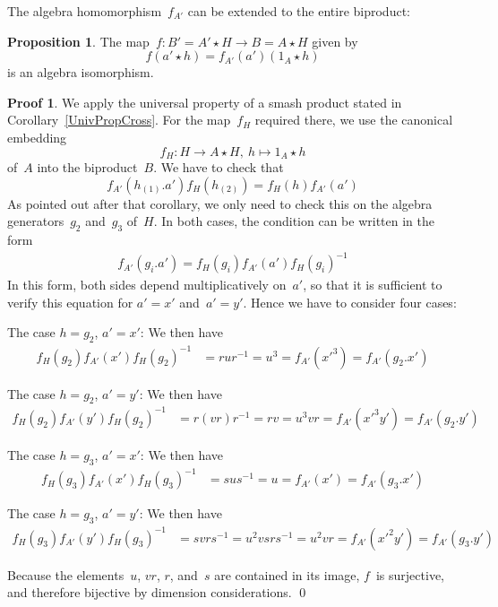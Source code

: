 \documentclass{article}
\newcounter{num}
\newenvironment{parlist}{\begin{list}{(\arabic{num})}{\usecounter{num} \leftmargin0pt \itemindent5pt \topsep0pt \labelwidth0pt}}{\end{list}}
\newcounter{num1}
\numberwithin{equation}{section}
\theoremstyle{definition}
\newtheorem*{prop}{Proposition}
\newtheorem*{pf}{Proof}
\theoremstyle{break}
\newcommand{\ua}{1_A}
\newcommand{\xu}{x'}
\newcommand{\yu}{y'}
\newcommand{\au}{a'}
\newcommand{\Au}{A'}
\newcommand{\Bu}{B'}
\newcommand{\1}{{(1)}}
\newcommand{\2}{{(2)}}
\newcommand{\3}{{(3)}}
\begin{document}
The algebra homomorphism~$f_{A'}$ can be extended to the entire biproduct:
\begin{prop}
The map~$f \colon \Bu = \Au \star H \to B= A \star H$ given by
\[f(\au \star h) = f_{A'}(\au) (\ua \star h)\]
is an algebra isomorphism.
\end{prop}
\begin{pf}
We apply the universal property of a smash product stated in Corollary~\ref{UnivPropCross}. For the map~$f_H$ required there, we use the canonical embedding
\[f_H \colon H \to A \star H,~h \mapsto \ua \star h \]
of~$A$ into the biproduct~$B$. We have to check that
\[f_{A'}(h_\1.\au) f_H(h_\2) = f_H(h) f_{A'}(\au)\]
As pointed out after that corollary, we only need to check this on the algebra generators~$g_2$ and~$g_3$ of~$H$. In both cases, the condition can be written in the form
\begin{align*}
f_{A'}(g_i.\au) = f_H(g_i) f_{A'}(\au) f_H(g_i)^{-1}
\end{align*}
In this form, both sides depend multiplicatively on~$\au$, so that it is sufficient to verify this equation for $\au = \xu$ and~$\au = \yu$. Hence we have to consider four cases:
\begin{parlist}
\item
The case $h=g_2$, $\au=\xu$: We then have
\begin{align*}
f_H(g_2) f_{A'}(\xu) f_H(g_2)^{-1} &= r u r^{-1} = u^3 = f_{A'}(\xu^3) = f_{A'}(g_2.\xu)
\end{align*}

\item
The case $h=g_2$, $\au=\yu$: We then have
\begin{align*}
f_H(g_2) f_{A'}(\yu) f_H(g_2)^{-1} &= r (vr) r^{-1} = rv = u^3 v r = f_{A'}(\xu^3 \yu) = f_{A'}(g_2.\yu)
\end{align*}

\item
The case $h=g_3$, $\au=\xu$: We then have
\begin{align*}
f_H(g_3) f_{A'}(\xu) f_H(g_3)^{-1} &= s u s^{-1} = u = f_{A'}(\xu) = f_{A'}(g_3.\xu)
\end{align*}

\item
The case $h=g_3$, $\au=\yu$: We then have
\begin{align*}
f_H(g_3) f_{A'}(\yu) f_H(g_3)^{-1} &= s v r s^{-1} = u^2 v s r s^{-1} = u^2 v r
= f_{A'}(\xu^2 \yu) = f_{A'}(g_3.\yu)
\end{align*}
\end{parlist}
Because the elements~$u$, $vr$, $r$, and~$s$ are contained in its image, $f$~is surjective, and therefore bijective by dimension considerations.
\qed
\end{pf}
\end{document}

